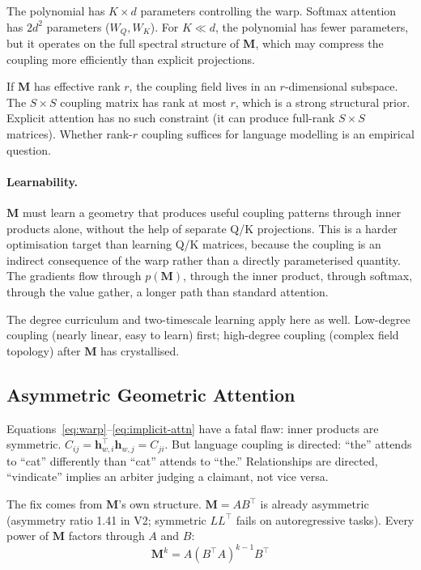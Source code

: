 \documentclass[11pt, a4paper]{article}
\newcommand{\M}{\mathbf{M}}
\newcommand{\h}{\mathbf{h}}
\theoremstyle{plain}
\theoremstyle{definition}
\theoremstyle{remark}
\begin{document}
The polynomial has $K \times d$ parameters controlling the warp.
Softmax attention has $2 d^2$ parameters ($W_Q, W_K$).
For $K \ll d$, the polynomial has fewer parameters, but it operates on the full spectral structure of $\M$, which may compress the coupling more efficiently than explicit projections.

If $\M$ has effective rank $r$, the coupling field lives in an $r$-dimensional subspace.
The $S \times S$ coupling matrix has rank at most $r$, which is a strong structural prior.
Explicit attention has no such constraint (it can produce full-rank $S \times S$ matrices).
Whether rank-$r$ coupling suffices for language modelling is an empirical question.

\paragraph{Learnability.}
$\M$ must learn a geometry that produces useful coupling patterns through inner products alone, without the help of separate Q/K projections.
This is a harder optimisation target than learning Q/K matrices, because the coupling is an indirect consequence of the warp rather than a directly parameterised quantity.
The gradients flow through $p(\M)$, through the inner product, through softmax, through the value gather, a longer path than standard attention.

The degree curriculum and two-timescale learning apply here as well.
Low-degree coupling (nearly linear, easy to learn) first; high-degree coupling (complex field topology) after $\M$ has crystallised.

\subsection{Asymmetric Geometric Attention}
\label{sec:asymmetric}

Equations~\ref{eq:warp}--\ref{eq:implicit-attn} have a fatal flaw: inner products are symmetric.
$C_{ij} = \h_{w,i}^\top \h_{w,j} = C_{ji}$.
But language coupling is directed: ``the'' attends to ``cat'' differently than ``cat'' attends to ``the.''
Relationships are directed, ``vindicate'' implies an arbiter judging a claimant, not vice versa.

The fix comes from $\M$'s own structure.
$\M = AB^\top$ is already asymmetric (asymmetry ratio 1.41 in V2; symmetric $LL^\top$ fails on autoregressive tasks).
Every power of $\M$ factors through $A$ and $B$:
\begin{equation}
\M^k = A (B^\top A)^{k-1} B^\top
\end{equation}
\end{document}
